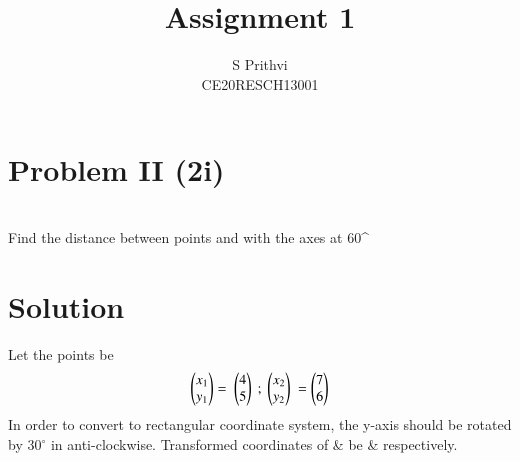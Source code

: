 \documentclass[journal,12pt,twocolumn]{IEEEtran}
\begin{document}
\def\putbox#1#2#3{\makebox[0in][l]{\makebox[#1][l]{}\raisebox{\baselineskip}[0in][0in]{\raisebox{#2}[0in][0in]{#3}}}}
     \def\rightbox#1{\makebox[0in][r]{#1}}
     \def\centbox#1{\makebox[0in]{#1}}
     \def\topbox#1{\raisebox{-\baselineskip}[0in][0in]{#1}}
     \def\midbox#1{\raisebox{-0.5\baselineskip}[0in][0in]{#1}}
\vspace{3cm}
\title{Assignment 1}
\author{S Prithvi \\ CE20RESCH13001}
\maketitle
\newpage
\bigskip
\renewcommand{\thefigure}{\theenumi}
\renewcommand{\thetable}{\theenumi}
\section*{Problem II (2\Large{i})}
\\Find the distance between points  and  with the axes at 60^{\circ}
\section{Solution}
Let the points be
\begin{align}
\begin{pmatrix}x_1\\y_1\end{pmatrix} = \ \begin{pmatrix}4 \\5\end{pmatrix} \ ; \ \begin{pmatrix}x_2\\y_2\end{pmatrix} \ = \begin{pmatrix}7\\ 6\end{pmatrix}
\end{align}
In order to convert to rectangular coordinate system, the y-axis should be rotated by $30^{\circ}$ in anti-clockwise.
Transformed coordinates of  \&  be  \&  respectively.
\end{document}

